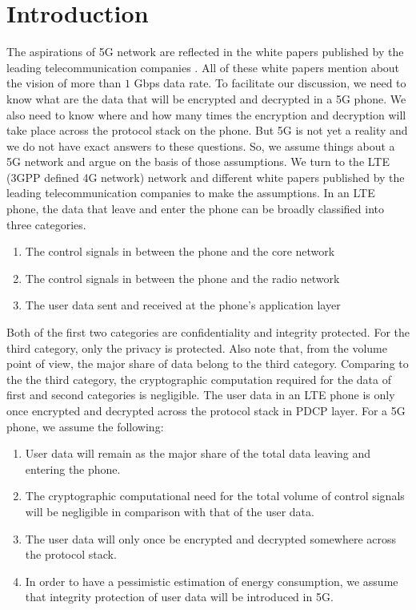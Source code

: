 \documentclass[lnicst,sechang,a4paper]{svmultln}
\begin{document}
\section{Introduction}
\label{intro} The aspirations of 5G network are reflected in the white papers published by the leading telecommunication companies \cite{Huawei_Vision,5G_Radio_Access-Ericsson,NGMN_5G_White_Paper}. All of these white papers mention about the vision of more than $1$ Gbps data rate. To facilitate our discussion, we need to know what are the data that will be encrypted and decrypted in a 5G phone. We also need to know where and how many times the encryption and decryption will take place across the protocol stack on the phone. But 5G is not yet a reality and we do not have exact answers to these questions. So, we assume things about a 5G network and argue on the basis of those assumptions. We turn to the LTE (3GPP defined 4G network) network and different white papers \cite{5G_Nework_Architecture_Whitepaper,5G_Scenarios_and_Security_Design, Ericsson_white_paper_energy} published by the leading telecommunication companies to make the assumptions. In an LTE phone, the data that leave and enter the phone can be broadly classified into three categories. 
\begin{enumerate}
\item The control signals in between the phone and the core network
\item The control signals in between the phone and the radio network
\item The user data sent and received at the phone's application layer
\end{enumerate}
Both of the first two categories are confidentiality and integrity protected. For the third category, only the privacy is protected. Also note that, from the volume point of view, the major share of data belong to the third category. Comparing to the the third category, the cryptographic computation required for the data of first and second categories is negligible. The user data in an LTE phone is only once encrypted and decrypted across the protocol stack in PDCP layer. For a 5G phone, we assume the following:
\begin{enumerate}
\item User data will remain as the major share of the total data leaving and entering the phone.
\item The cryptographic computational need for the total volume of control signals will be negligible in comparison with that of the user data.
\item The user data will only once be encrypted and decrypted somewhere across the protocol stack.
\item In order to have a pessimistic estimation of energy consumption, we assume that integrity protection of user data will be introduced in 5G.
\end{enumerate}
\end{document}
